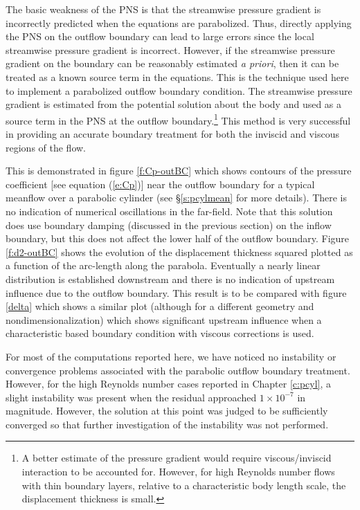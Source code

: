 The basic weakness of the PNS is that the streamwise pressure gradient is
incorrectly predicted when the equations are parabolized.  Thus, directly
applying the PNS on the outflow boundary can lead to large errors since the
local streamwise pressure gradient is incorrect.  However, if the streamwise
pressure gradient on the boundary can be reasonably estimated {\it a priori},
then it can be treated as a known source term in the equations.  This is the
technique used here to implement a parabolized outflow boundary condition.
The streamwise pressure gradient is estimated from the potential solution
about the body and used as a source term in the PNS at the outflow
boundary.\footnote{A better estimate of the pressure gradient would require
viscous/inviscid interaction to be accounted for.  However, for high Reynolds
number flows with thin boundary layers, relative to a characteristic body
length scale, the displacement thickness is small.}  This method is very
successful in providing an accurate boundary treatment for both the inviscid
and viscous regions of the flow.

This is demonstrated in figure \ref{f:Cp-outBC} which shows contours of the
pressure coefficient [see equation (\ref{e:Cp})] near the outflow boundary for
a typical meanflow over a parabolic cylinder (see \S\ref{s:pcylmean} for more
details).  There is no indication of numerical oscillations in the far-field.
Note that this solution does use boundary damping (discussed in the previous
section) on the inflow boundary, but this does not affect the lower half of
the outflow boundary.  Figure \ref{f:d2-outBC} shows the evolution of the
displacement thickness squared plotted as a function of the arc-length along
the parabola.  Eventually a nearly linear distribution is established
downstream and there is no indication of upstream influence due to the outflow
boundary.  This result is to be compared with figure \ref{delta} which shows a
similar plot (although for a different geometry and nondimensionalization)
which shows significant upstream influence when a characteristic based
boundary condition \cite{PoLe:92} with viscous corrections is used.

For most of the computations reported here, we have noticed no instability or
convergence problems associated with the parabolic outflow boundary treatment.
However, for the high Reynolds number cases reported in Chapter \ref{c:pcyl}, a
slight instability was present when the residual approached $1\times 10^{-7}$
in magnitude.  However, the solution at this point was judged to be
sufficiently converged so that further investigation of the instability was
not performed.

